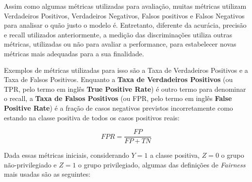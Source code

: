 \documentclass[portugues]{ic-tese}
\begin{document}
Assim como algumas métricas utilizadas para avaliação, muitas métricas utilizam Verdadeiros Positivos, Verdadeiros Negativos, Falsos positivos e Falsos Negativos para analisar o quão justo o modelo é. Entretanto, diferente da acurácia, precisão e recall utilizados anteriormente, a medição das discriminações utiliza outras métricas, utilizadas ou não para avaliar a performance, para estabelecer novas métricas mais adequadas para a sua finalidade.

Exemplos de métricas utilizadas para isso são a Taxa de Verdadeiros Positivos e a Taxa de Falsos Positivos. Enquanto a \textbf{Taxa de Verdadeiros Positivos} (ou TPR, pelo termo em inglês \textbf{True Positive Rate}) é outro termo para denominar o recall, a \textbf{Taxa de Falsos Positivos} (ou FPR, pelo termo em inglês \textbf{False Positive Rate}) é a fração de casos negativos previstos incorretamente como estando na classe positiva de todos os casos positivos reais:

\begin{equation}
FPR = \frac{FP}{FP + TN}
\end{equation}

Dada essas métricas iniciais, considerando $Y=1$ a classe positiva, $Z=0$ o grupo não-privilegiado e $Z=1$ o grupo privilegiado, algumas das definições de \textit{Fairness} mais usadas são as seguintes:
\end{document}
